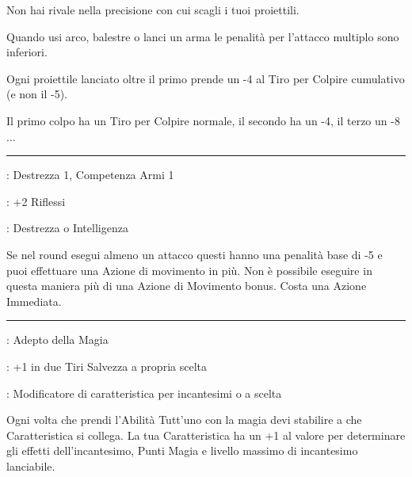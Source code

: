 \begin{multicols}{2}
Non hai rivale nella precisione con cui scagli i tuoi proiettili.

Quando usi arco, balestre o lanci un arma le penalità per l'attacco multiplo sono inferiori.

Ogni proiettile lanciato oltre il primo prende un -4 al Tiro per Colpire cumulativo (e non il -5).

Il primo colpo ha un Tiro per Colpire normale, il secondo ha un -4, il terzo un -8 ...

\smallskip\noindent\rule{\linewidth}{2pt} \hypertarget{Toccata e fuga}{}\medskip{}
\noindent
\begin{description}[noitemsep, topsep=0pt, parsep=0pt, partopsep=0pt, leftmargin=0cm, labelwidth=2.5cm]
    \item[\textbf{Requisito}]: Destrezza 1, Competenza Armi 1
    \item[\textbf{Tiri Salvezza}]: +2 Riflessi
    \item[\textbf{Caratteristica}]: Destrezza o Intelligenza
\end{description}

Se nel round esegui almeno un attacco questi hanno una penalità base di -5 e puoi effettuare una Azione di movimento in più. Non è possibile eseguire in questa maniera più di una Azione di Movimento bonus. Costa una Azione Immediata.

\smallskip\noindent\rule{\linewidth}{2pt} \hypertarget{Tutt'uno con la magia}{}\medskip{}\label{Tutt'uno con la magia}
\noindent
\begin{description}[noitemsep, topsep=0pt, parsep=0pt, partopsep=0pt, leftmargin=0cm, labelwidth=2.5cm]
    \item[\textbf{Requisito}]: Adepto della Magia
    \item[\textbf{Tiri Salvezza}]: +1 in due Tiri Salvezza a propria scelta
    \item[\textbf{Caratteristica}]: Modificatore di caratteristica per incantesimi o a scelta
\end{description}

Ogni volta che prendi l'Abilità Tutt'uno con la magia devi stabilire a che Caratteristica si collega.
La tua Caratteristica ha un +1 al valore per determinare gli effetti dell'incantesimo, Punti Magia e livello massimo di incantesimo lanciabile.


\end{multicols}

